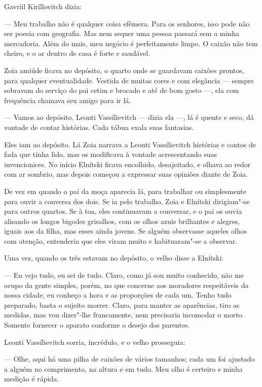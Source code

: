 Gavriil Kiríllovitch dizia:

--- Meu trabalho não é qualquer coisa efêmera. Para os senhores, isso
pode não ser poesia com geografia. Mas nem sequer uma pessoa passará sem
a minha mercadoria. Além do mais, meu negócio é perfeitamente limpo. O
caixão não tem cheiro, e o ar dentro de casa é forte e saudável.

Zoia amiúde ficava no depósito, o quarto onde se guardavam caixões
prontos, para qualquer eventualidade. Vestida de muitas cores e com
elegância --- sempre sobravam do serviço do pai cetim e brocado e até de
bom gosto ---, ela com frequência chamava seu amigo para ir lá.

--- Vamos ao depósito, Leonti Vassílievitch --- dizia ela ---, lá é
quente e seco, dá vontade de contar histórias. Cada tábua exala suas
fantasias.

Eles iam ao depósito. Lá Zoia narrava a Leonti Vassílievitch histórias e
contos de fada que tinha lido, mas os modificava à vontade acrescentando
suas invencionices. No início Elnítski ficava encolhido, desajeitado, e
olhava ao redor com ar sombrio, mas depois começou a expressar suas
opiniões diante de Zoia.

De vez em quando o pai da moça aparecia lá, para trabalhar ou
simplesmente para ouvir a conversa dos dois. Se ia pelo trabalho, Zoia e
Elnítski dirigiam"-se para outros quartos. Se à toa, eles continuavam a
conversar, e o pai os ouvia alisando os longos bigodes grisalhos, com os
olhos azuis brilhantes e alegres, iguais aos da filha, mas esses ainda
jovens. Se alguém observasse aqueles olhos com atenção, entenderia que
eles viram muito e habituaram"-se a observar.

Uma vez, quando os três estavam no depósito, o velho disse a Elnítski:

--- Eu vejo tudo, eu sei de tudo. Claro, como já sou muito conhecido,
não me ocupo da gente simples, porém, no que concerne aos moradores
respeitáveis da nossa cidade, eu conheço a hora e as proporções de cada
um. Tenho tudo preparado, basta o sujeito morrer. Claro, para manter as
aparências, tiro as medidas, mas vou dizer"-lhe francamente, nem
precisaria incomodar o morto. Somente fornecer o aparato conforme o
desejo dos parentes.

Leonti Vassílievitch sorria, incrédulo, e o velho prosseguia:

--- Olhe, aqui há uma pilha de caixões de vários tamanhos; cada um foi
ajustado a alguém no comprimento, na altura e em tudo. Meu olho é
certeiro e minha medição é rápida.

